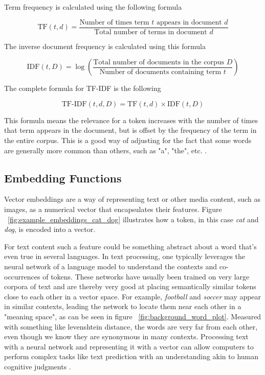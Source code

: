 Term frequency is calculated using the following formula


\begin{equation}
        \text{TF}(t, d) = \frac{\text{Number of times term } t \text{ appears in document } d}{\text{Total number of terms in document } d}
\end{equation}

The inverse document frequency is calculated using this formula


\begin{equation}
        \text{IDF}(t, D) = \log \left(\frac{\text{Total number of documents in the corpus } D}{\text{Number of documents containing term } t}\right)
\end{equation}

The complete formula for TF-IDF is the following


\begin{equation}
        \text{TF-IDF}(t, d, D) = \text{TF}(t, d) \times \text{IDF}(t, D)
\end{equation}


This formula means the relevance for a token increases with the number of times that term appears in the document, but is offset by the frequency of the term in the entire corpus. This is a good way of adjusting for the fact that some words are generally more common than others, such as "a", "the", etc. \cite{christopher_d_introduction_2008}.


\subsection{Embedding Functions}
\label{sec:embedding_functions}


Vector embeddings are a way of representing text or other media content, such as images, as a numerical vector that encapsulates their features. Figure ~\ref{fig:example_embeddings_cat_dog} illustrates how a token, in this case \textit{cat} and \textit{dog}, is encoded into a vector.





For text content such a feature could be something abstract about a word that’s even true in several languages. In text processing, one typically leverages the neural network of a language model to understand the contexts and co-occurrences of tokens. These networks have usually been trained on very large corpora of text and are thereby very good at placing semantically similar tokens close to each other in a vector space. For example, \textit{football} and \textit{soccer} may appear in similar contexts, leading the network to locate them near each other in a "meaning space", as can be seen in figure ~\ref{fig:background_word_plot}. Measured with something like levenshtein distance, the words are very far from each other, even though we know they are synonymous in many contexts. Processing text with a neural network and representing it with a vector can allow computers to perform complex tasks like text prediction with an understanding akin to human cognitive judgments \cite{mikolov_efficient_2013}.


